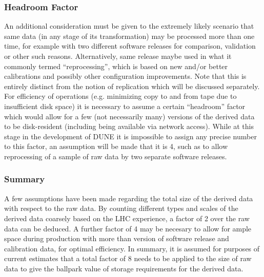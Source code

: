 \subsubsection{Headroom Factor}
An additional consideration must be given to the extremely likely scenario that same data (in any stage of
its transformation) may be processed more than one time, for example with two different software releases for comparison,
validation or other such reasons. Alternatively, same release maybe used in what it commonly termed ``reprocessing'',
which is based on new and/or better calibrations and possibly other configuration improvements. Note that this is entirely
distinct from the notion of replication which will be discussed separately. For efficiency of operations (e.g. minimizing copy
to and from tape due to insufficient disk space) it is necessary to assume a certain ``headroom'' factor which would allow
for a few (not necessarily many) versions of the derived data to be disk-resident (including being available via
network access). While at this stage in the development of DUNE it is impossible to assign any precise number to this
factor, an assumption will be made that it is 4, such as to allow reprocessing of a sample of raw data by two separate
software releases.

\subsubsection{Summary}
\label{sec:derived-data-factor}
A few assumptions have been made regarding the total size of the derived data with respect to the raw data. By counting
different types and scales of the derived data coarsely based on the LHC experience, a factor of 2 over the raw data can
be deduced. A further factor of 4 may be necesary to allow for ample space during production with more than version
of software release and calibration data, for optimal efficiency. In summary, it is assumed for purposes of current estimates
that a total factor of 8 needs to be applied to the size of raw data to give the ballpark value of storage requirements for
the derived data.


